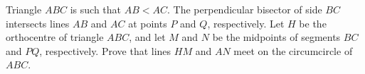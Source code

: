 Triangle $ABC$ is such that $AB < AC$. The perpendicular bisector of side $BC$ intersects lines $AB$ and $AC$ at points $P$ and $Q$,  respectively. Let $H$ be the orthocentre of triangle $ABC$,  and let $M$ and $N$ be the midpoints of segments $BC$ and $PQ$,  respectively. Prove that lines $HM$ and $AN$ meet on the circumcircle of $ABC$.